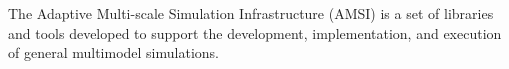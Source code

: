 The Adaptive Multi-scale Simulation Infrastructure (AMSI) is a set of libraries and tools developed to support the development, implementation, and execution of general multimodel simulations.


